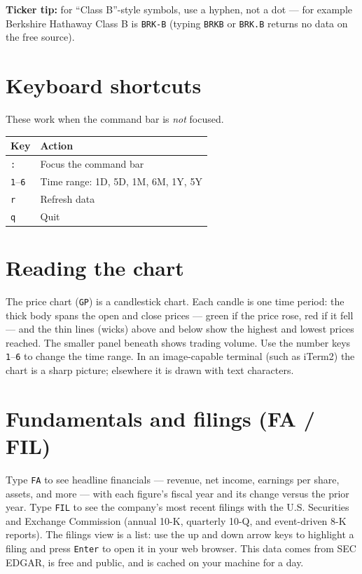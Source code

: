 \documentclass[11pt]{article}
\begin{document}
\textbf{Ticker tip:} for ``Class B''-style symbols, use a hyphen, not a dot ---
for example Berkshire Hathaway Class B is \texttt{BRK-B} (typing \texttt{BRKB} or
\texttt{BRK.B} returns no data on the free source).

\section{Keyboard shortcuts}
These work when the command bar is \emph{not} focused.
\begin{center}
\begin{tabular}{ll}
\toprule
Key & Action \\
\midrule
\texttt{:} & Focus the command bar \\
\texttt{1}--\texttt{6} & Time range: 1D, 5D, 1M, 6M, 1Y, 5Y \\
\texttt{r} & Refresh data \\
\texttt{q} & Quit \\
\bottomrule
\end{tabular}
\end{center}

\section{Reading the chart}
The price chart (\texttt{GP}) is a candlestick chart. Each candle is one time
period: the thick body spans the open and close prices --- green if the price
rose, red if it fell --- and the thin lines (wicks) above and below show the
highest and lowest prices reached. The smaller panel beneath shows trading
volume. Use the number keys \texttt{1}--\texttt{6} to change the time range. In an
image-capable terminal (such as iTerm2) the chart is a sharp picture; elsewhere
it is drawn with text characters.

\section{Fundamentals and filings (FA / FIL)}
Type \texttt{FA} to see headline financials --- revenue, net income, earnings
per share, assets, and more --- with each figure's fiscal year and its change
versus the prior year. Type \texttt{FIL} to see the company's most recent filings
with the U.S. Securities and Exchange Commission (annual 10-K, quarterly 10-Q,
and event-driven 8-K reports). The filings view is a list: use the up and down
arrow keys to highlight a filing and press \texttt{Enter} to open it in your web
browser. This data comes from SEC EDGAR, is free and public, and is cached on
your machine for a day.
\end{document}
